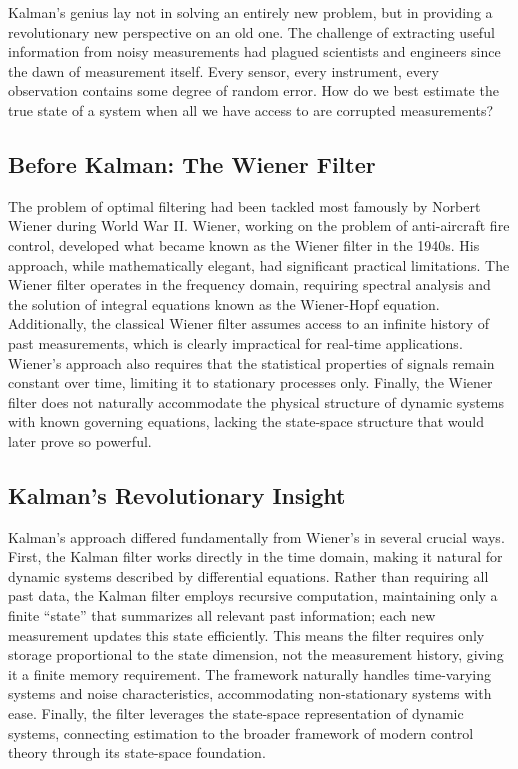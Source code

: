 Kalman's genius lay not in solving an entirely new problem, but in providing a revolutionary new perspective on an old one. The challenge of extracting useful information from noisy measurements had plagued scientists and engineers since the dawn of measurement itself. Every sensor, every instrument, every observation contains some degree of random error. How do we best estimate the true state of a system when all we have access to are corrupted measurements?

\subsection{Before Kalman: The Wiener Filter}

The problem of optimal filtering had been tackled most famously by Norbert Wiener during World War II. Wiener, working on the problem of anti-aircraft fire control, developed what became known as the Wiener filter in the 1940s. His approach, while mathematically elegant, had significant practical limitations. The Wiener filter operates in the frequency domain, requiring spectral analysis and the solution of integral equations known as the Wiener-Hopf equation. Additionally, the classical Wiener filter assumes access to an infinite history of past measurements, which is clearly impractical for real-time applications. Wiener's approach also requires that the statistical properties of signals remain constant over time, limiting it to stationary processes only. Finally, the Wiener filter does not naturally accommodate the physical structure of dynamic systems with known governing equations, lacking the state-space structure that would later prove so powerful.

\subsection{Kalman's Revolutionary Insight}

Kalman's approach differed fundamentally from Wiener's in several crucial ways. First, the Kalman filter works directly in the time domain, making it natural for dynamic systems described by differential equations. Rather than requiring all past data, the Kalman filter employs recursive computation, maintaining only a finite ``state'' that summarizes all relevant past information; each new measurement updates this state efficiently. This means the filter requires only storage proportional to the state dimension, not the measurement history, giving it a finite memory requirement. The framework naturally handles time-varying systems and noise characteristics, accommodating non-stationary systems with ease. Finally, the filter leverages the state-space representation of dynamic systems, connecting estimation to the broader framework of modern control theory through its state-space foundation.

